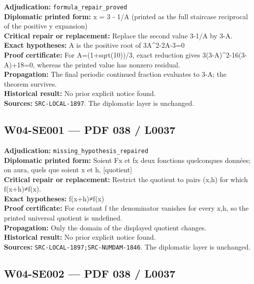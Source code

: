 \documentclass[
  10pt,
  a4paper,
]{scrreprt}
\begin{document}
\textbf{Adjudication:} \texttt{formula\_repair\_proved}\\
\textbf{Diplomatic printed form:} x = 3 - 1/A (printed as the full
staircase reciprocal of the positive y expansion)\\
\textbf{Critical repair or replacement:} Replace the second value 3-1/A
by 3-A.\\
\textbf{Exact hypotheses:} A is the positive root of 3A\^{}2-2A-3=0\\
\textbf{Proof certificate:} For A=(1+sqrt(10))/3, exact reduction gives
3(3-A)\^{}2-16(3-A)+18=0, whereas the printed value has nonzero
residual.\\
\textbf{Propagation:} The final periodic continued fraction evaluates to
3-A; the theorem survives.\\
\textbf{Historical result:} No prior explicit notice found.\\
\textbf{Sources:} \texttt{SRC-LOCAL-1897}. The diplomatic layer is
unchanged.

\subsection{W04-SE001 --- PDF 038 /
L0037}\label{w04-se001-pdf-038-l0037}

\textbf{Adjudication:} \texttt{missing\_hypothesis\_repaired}\\
\textbf{Diplomatic printed form:} Soient Fx et fx deux fonctions
quelconques données; on aura, quels que soient x et h, {[}quotient{]}\\
\textbf{Critical repair or replacement:} Restrict the quotient to pairs
(x,h) for which f(x+h)≠f(x).\\
\textbf{Exact hypotheses:} f(x+h)≠f(x)\\
\textbf{Proof certificate:} For constant f the denominator vanishes for
every x,h, so the printed universal quotient is undefined.\\
\textbf{Propagation:} Only the domain of the displayed quotient
changes.\\
\textbf{Historical result:} No prior explicit notice found.\\
\textbf{Sources:} \texttt{SRC-LOCAL-1897;SRC-NUMDAM-1846}. The
diplomatic layer is unchanged.

\subsection{W04-SE002 --- PDF 038 /
L0037}\label{w04-se002-pdf-038-l0037}
\end{document}
